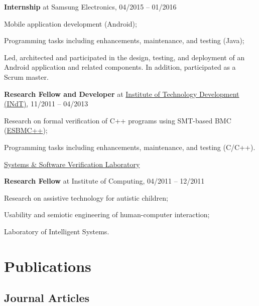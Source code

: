 \documentclass[letterpaper]{article}
\renewenvironment{itemize}{
  \begin{list}{}{
    \setlength{\leftmargin}{1.5em}
  }
}{
  \end{list}
}
\begin{document}
\begin{enumerate}
\begin{itemize}
      \end{itemize}
      \item{{\bf Internship} at Samsung Electronics, 04/2015 -- 01/2016}
      \begin{itemize}
        \item{\textendash} {Mobile application development (Android);}
        \item{\textendash} {Programming tasks including enhancements, maintenance, and testing (Java);}
        \item{\textendash} {Led, architected and participated in the design, testing, and deployment of an Android application and related components. In addition, participated as a Scrum master.}
      \end{itemize}
      \item{{\bf Research Fellow and Developer} at \href{http://www.indt.org.br}{Institute of Technology Development (INdT)}, 11/2011 -- 04/2013}
            \begin{itemize}
        \item{\textendash} {Research on formal verification of C++ programs using SMT-based BMC (\href{http://www.esbmc/}{ESBMC++});}
        \item{\textendash} {Programming tasks including enhancements, maintenance, and testing (C/C++).}
        \item{\textendash} \href{https://ssvlab.github.io}{Systems \& Software Verification Laboratory}
      \end{itemize}
      \item{{\bf Research Fellow} at Institute of Computing, 04/2011 -- 12/2011}
            \begin{itemize}
        \item{\textendash} {Research on assistive technology for autistic children;}
        \item{\textendash} {Usability and semiotic engineering of human-computer interaction;}
        \item{\textendash} {Laboratory of Intelligent Systems.}
      \end{itemize}
    \end{enumerate}
    
\section*{Publications}

\subsection*{Journal Articles}
\end{document}
